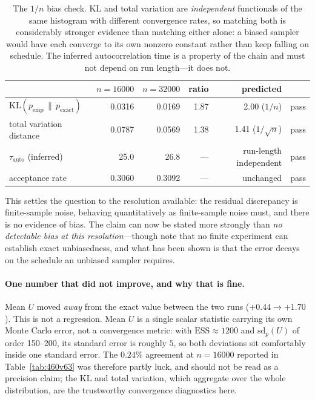\documentclass[11pt,a4paper]{article}
\begin{document}
\begin{table}[htbp]
\centering
\begin{tabular}{l rr r r l}
\toprule
 & $n=16000$ & $n=32000$ & ratio & predicted & \\
\midrule
$\mathrm{KL}(p_{\mathrm{emp}}\,\|\,p_{\mathrm{exact}})$
  & 0.0316 & 0.0169 & 1.87 & 2.00 \;($1/n$)        & pass \\
total variation distance
  & 0.0787 & 0.0569 & 1.38 & 1.41 \;($1/\sqrt{n}$) & pass \\
\midrule
$\tau_{\mathrm{auto}}$ (inferred)
  & 25.0 & 26.8 & --- & run-length independent & pass \\
acceptance rate
  & 0.3060 & 0.3092 & --- & unchanged & pass \\
\bottomrule
\end{tabular}
\caption{The $1/n$ bias check. KL and total variation are \emph{independent}
functionals of the same histogram with different convergence rates, so
matching both is considerably stronger evidence than matching either alone: a
biased sampler would have each converge to its own nonzero constant rather
than keep falling on schedule. The inferred autocorrelation time is a property
of the chain and must not depend on run length---it does not.}
\label{tab:bias-check}
\end{table}

\noindent
This settles the question to the resolution available: the residual
discrepancy is finite-sample noise, behaving quantitatively as finite-sample
noise must, and there is no evidence of bias. The claim can now be stated more
strongly than \emph{no detectable bias at this resolution}---though note that
no finite experiment can establish exact unbiasedness, and what has been shown
is that the error decays on the schedule an unbiased sampler requires.

\paragraph{One number that did not improve, and why that is fine.} Mean $U$
moved \emph{away} from the exact value between the two runs ($+0.44 \to
+1.70$). This is not a regression. Mean $U$ is a single scalar statistic
carrying its own Monte Carlo error, not a convergence metric: with
$\mathrm{ESS}\approx 1200$ and $\mathrm{sd}_{p}(U)$ of order 150--200, its
standard error is roughly $5$, so both deviations sit comfortably inside one
standard error. The $0.24\%$ agreement at $n=16000$ reported in
Table~\ref{tab:460v63} was therefore partly luck, and should not be read as a
precision claim; the KL and total variation, which aggregate over the whole
distribution, are the trustworthy convergence diagnostics here.
\end{document}
